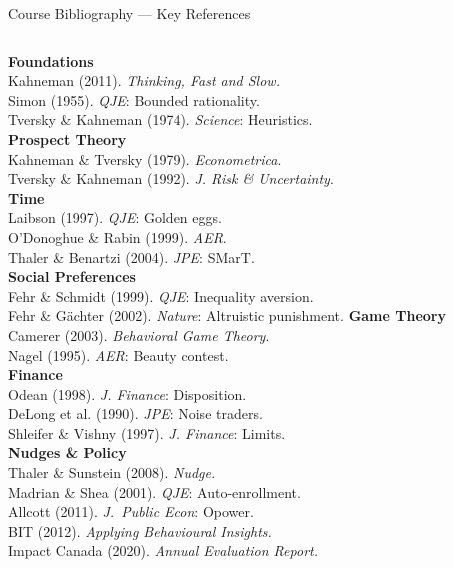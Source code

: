 \documentclass[aspectratio=169]{beamer}
\begin{document}
\begin{frame}{Course Bibliography --- Key References}
\footnotesize
\begin{columns}
\textbf{Foundations}\\
Kahneman (2011). \textit{Thinking, Fast and Slow.}\\
Simon (1955). \textit{QJE}: Bounded rationality.\\
Tversky \& Kahneman (1974). \textit{Science}: Heuristics.\\[0.3em]
\textbf{Prospect Theory}\\
Kahneman \& Tversky (1979). \textit{Econometrica}.\\
Tversky \& Kahneman (1992). \textit{J. Risk \& Uncertainty}.\\[0.3em]
\textbf{Time}\\
Laibson (1997). \textit{QJE}: Golden eggs.\\
O'Donoghue \& Rabin (1999). \textit{AER}.\\
Thaler \& Benartzi (2004). \textit{JPE}: SMarT.\\[0.3em]
\textbf{Social Preferences}\\
Fehr \& Schmidt (1999). \textit{QJE}: Inequality aversion.\\
Fehr \& Gächter (2002). \textit{Nature}: Altruistic punishment.
\textbf{Game Theory}\\
Camerer (2003). \textit{Behavioral Game Theory}.\\
Nagel (1995). \textit{AER}: Beauty contest.\\[0.3em]
\textbf{Finance}\\
Odean (1998). \textit{J. Finance}: Disposition.\\
DeLong et al. (1990). \textit{JPE}: Noise traders.\\
Shleifer \& Vishny (1997). \textit{J. Finance}: Limits.\\[0.3em]
\textbf{Nudges \& Policy}\\
Thaler \& Sunstein (2008). \textit{Nudge.}\\
Madrian \& Shea (2001). \textit{QJE}: Auto-enrollment.\\
Allcott (2011). \textit{J.\ Public Econ}: Opower.\\
BIT (2012). \textit{Applying Behavioural Insights.}\\
Impact Canada (2020). \textit{Annual Evaluation Report.}
\end{columns}
\end{frame}
\end{document}
